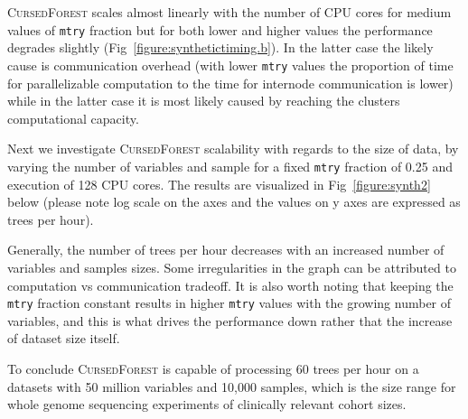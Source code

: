 \documentclass[10pt,letterpaper]{article}
\newcommand{\cursedforest}{\textsc{CursedForest}\xspace}
\newcommand{\mtry}{\texttt{mtry}\xspace}
\begin{document}
\cursedforest scales almost linearly with the number of CPU cores for medium values of \mtry fraction but for both lower
and higher values the performance degrades slightly (Fig~\ref{figure:synthetictiming.b}). In the latter case the likely
cause is communication overhead (with lower \mtry values the proportion of time for parallelizable computation to the
time for internode communication is lower) while in the latter case it is most likely caused by reaching the clusters
computational capacity.

Next we investigate \cursedforest scalability with regards to the size of data, by varying the number of variables and
sample for a fixed \mtry fraction of 0.25 and execution of 128 CPU cores. The results are visualized in
Fig~\ref{figure:synth2} below (please note log scale on the axes and the values on y axes are expressed as trees per
hour).

Generally, the number of trees per hour decreases with an increased number of variables and samples sizes. Some
irregularities in the graph can be attributed to computation vs communication tradeoff. It is also worth noting that
keeping the \mtry fraction constant results in higher \mtry values with the growing number of variables, and this is
what drives the performance down rather that the increase of dataset size itself.

To conclude \cursedforest is capable of processing 60 trees per hour on a datasets with 50 million variables and 10,000
samples, which is the size range for whole genome sequencing experiments of clinically relevant cohort sizes.
\end{document}
